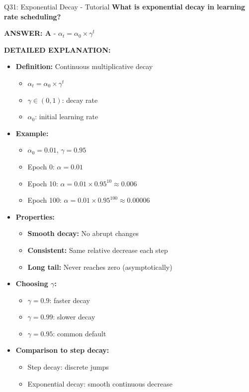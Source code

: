 \documentclass[8pt]{beamer}
\begin{document}
	\begin{frame}{Q31: Exponential Decay - Tutorial}
		\fontsize{6.5}{7.5}\selectfont
		\textbf{What is exponential decay in learning rate scheduling?}
		
		\vspace{0.05cm}
		\textcolor{myblue}{\textbf{ANSWER: A}} - $\alpha_t = \alpha_0 \times \gamma^{t}$
		
		\vspace{0.05cm}
		\textbf{DETAILED EXPLANATION:}
		\begin{itemize}
			\item \textbf{Definition:} Continuous multiplicative decay
			\begin{itemize}
				\item $\alpha_t = \alpha_0 \times \gamma^{t}$
				\item $\gamma \in (0, 1)$: decay rate
				\item $\alpha_0$: initial learning rate
			\end{itemize}
			\item \textbf{Example:}
			\begin{itemize}
				\item $\alpha_0 = 0.01$, $\gamma = 0.95$
				\item Epoch 0: $\alpha = 0.01$
				\item Epoch 10: $\alpha = 0.01 \times 0.95^{10} \approx 0.006$
				\item Epoch 100: $\alpha = 0.01 \times 0.95^{100} \approx 0.00006$
			\end{itemize}
			\item \textbf{Properties:}
			\begin{itemize}
				\item \textbf{Smooth decay:} No abrupt changes
				\item \textbf{Consistent:} Same relative decrease each step
				\item \textbf{Long tail:} Never reaches zero (asymptotically)
			\end{itemize}
			\item \textbf{Choosing $\gamma$:}
			\begin{itemize}
				\item $\gamma = 0.9$: faster decay
				\item $\gamma = 0.99$: slower decay
				\item $\gamma = 0.95$: common default
			\end{itemize}
			\item \textbf{Comparison to step decay:}
			\begin{itemize}
				\item Step decay: discrete jumps
				\item Exponential decay: smooth continuous decrease
			\end{itemize}
		\end{itemize}
		

\end{frame}
\end{document}
